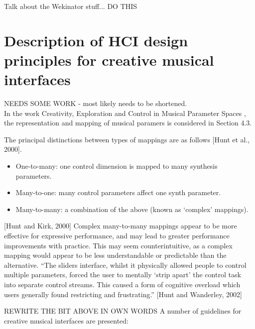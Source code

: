 \documentclass[11pt, oneside]{report}   	%
\begin{document}
Talk about the Wekinator stuff... DO THIS

\section{Description of HCI design principles for creative musical interfaces}\label{sec:Tubb}
NEEDS SOME WORK - most likely needs to be shortened.\\
In the work Creativity, Exploration and Control in Musical Parameter Spaces \cite{TubbThesis}, the representation and mapping of musical paramers is considered in Section 4.3.

\begin{displayquote}
The principal distinctions between types of mappings are as follows [Hunt et al., 2000].
\begin{itemize}
\setlength\itemsep{-1.2em}
\item One-to-many: one control dimension is mapped to many synthesis parameters.
\item Many-to-one: many control parameters affect one synth parameter.
\item Many-to-many: a combination of the above (known as ‘complex’ mappings).
\end{itemize}

[Hunt and Kirk, 2000] Complex many-to-many mappings appear to be more effective for expressive performance, and may lead to greater performance improvements with practice. This may seem counterintuitive, as a complex mapping would appear to be less understandable or predictable than the alternative.
“The sliders interface, whilst it physically allowed people to control multiple parameters, forced the user to mentally ‘strip apart’ the control task into separate control streams. This caused a form of cognitive overload which users generally found restricting and frustrating.”
[Hunt and Wanderley, 2002]
\end{displayquote}
REWRITE THE BIT ABOVE IN OWN WORDS 
A number of guidelines for creative musical interfaces are presented:
\end{document}
